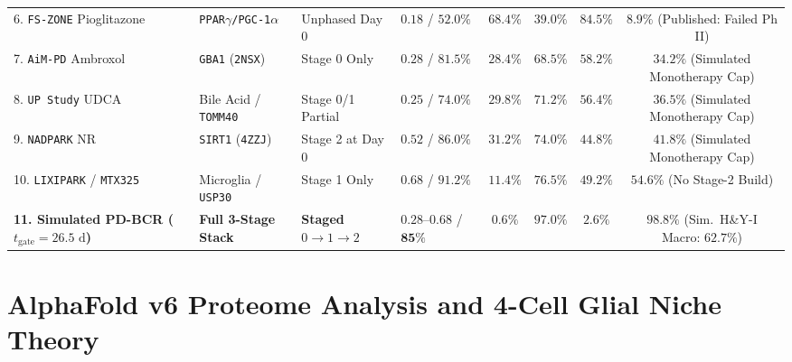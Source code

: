 \documentclass[11pt]{article}
\theoremstyle{plain}
\begin{document}
\begin{table}[t]
{\begin{tabular}{@{}llllcccc@{}}
6. \texttt{FS-ZONE} Pioglitazone \cite{fszone2015pioglitazone} & \texttt{PPAR$\gamma$/PGC-1$\alpha$} & Unphased Day 0 & $0.18$ / $52.0\%$ & $\mathbf{68.4\%}$ & $39.0\%$ & $84.5\%$ & $8.9\%$ (Published: Failed Ph II) \\
7. \texttt{AiM-PD} Ambroxol \cite{mullin2020ambroxol} & \texttt{GBA1} (\texttt{2NSX}) \cite{lieberman2007gba1} & Stage 0 Only & $0.28$ / $81.5\%$ & $28.4\%$ & $68.5\%$ & $58.2\%$ & $34.2\%$ (Simulated Monotherapy Cap) \\
8. \texttt{UP Study} UDCA \cite{payne2023udca} & Bile Acid / \texttt{TOMM40} & Stage 0/1 Partial & $0.25$ / $74.0\%$ & $29.8\%$ & $71.2\%$ & $56.4\%$ & $36.5\%$ (Simulated Monotherapy Cap) \\
9. \texttt{NADPARK} NR \cite{brakedal2022nadpark} & \texttt{SIRT1} (\texttt{4ZZJ}) \cite{dai2015sirt1} & Stage 2 at Day 0 & $0.52$ / $86.0\%$ & $31.2\%$ & $74.0\%$ & $44.8\%$ & $41.8\%$ (Simulated Monotherapy Cap) \\
10. \texttt{LIXIPARK} / \texttt{MTX325} \cite{meissner2024lixipark} & Microglia / \texttt{USP30} & Stage 1 Only & $0.68$ / $91.2\%$ & $11.4\%$ & $76.5\%$ & $49.2\%$ & $54.6\%$ (No Stage-2 Build) \\
\midrule
\textbf{11. Simulated PD-BCR ($t_{\mathrm{gate}}=26.5\text{ d}$)} & \textbf{Full 3-Stage Stack} & \textbf{Staged $0\to 1\to 2$} & $\mathbf{0.28\text{--}0.68}$ / $\mathbf{85\%}$ & $\mathbf{0.6\%}$ & $\mathbf{97.0\%}$ & $\mathbf{2.6\%}$ & $\mathbf{98.8\%}$ (Sim.\ H\&Y-I Macro: $\mathbf{62.7\%}$) \\
\bottomrule
\end{tabular}%
}
\end{table}

\section{AlphaFold v6 Proteome Analysis and 4-Cell Glial Niche Theory}
\end{document}
